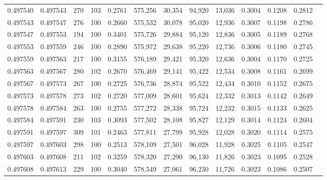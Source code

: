 \begin{tabular}{rrrrrrrrrrrrr}
0.497540 & 0.497543 &   270 & 103 &                                     0.2761 & 575,256 &  30,354 &  94,920 &  13,036 & 0.3004 & 0.1208 & 0.2812 \\
0.497543 & 0.497547 &   276 & 100 &                                     0.2660 & 575,532 &  30,078 &  95,020 &  12,936 & 0.3007 & 0.1198 & 0.2786 \\
0.497547 & 0.497553 &   194 & 100 &                                     0.3401 & 575,726 &  29,884 &  95,120 &  12,836 & 0.3005 & 0.1189 & 0.2768 \\
0.497553 & 0.497559 &   246 & 100 &                                     0.2890 & 575,972 &  29,638 &  95,220 &  12,736 & 0.3006 & 0.1180 & 0.2745 \\
0.497559 & 0.497563 &   217 & 100 &                                     0.3155 & 576,189 &  29,421 &  95,320 &  12,636 & 0.3004 & 0.1170 & 0.2725 \\
0.497563 & 0.497567 &   280 & 102 &                                     0.2670 & 576,469 &  29,141 &  95,422 &  12,534 & 0.3008 & 0.1161 & 0.2699 \\
0.497567 & 0.497573 &   267 & 100 &                                     0.2725 & 576,736 &  28,874 &  95,522 &  12,434 & 0.3010 & 0.1152 & 0.2675 \\
0.497573 & 0.497578 &   273 & 102 &                                     0.2720 & 577,009 &  28,601 &  95,624 &  12,332 & 0.3013 & 0.1142 & 0.2649 \\
0.497578 & 0.497584 &   263 & 100 &                                     0.2755 & 577,272 &  28,338 &  95,724 &  12,232 & 0.3015 & 0.1133 & 0.2625 \\
0.497584 & 0.497591 &   230 & 103 &                                     0.3093 & 577,502 &  28,108 &  95,827 &  12,129 & 0.3014 & 0.1124 & 0.2604 \\
0.497591 & 0.497597 &   309 & 101 &                                     0.2463 & 577,811 &  27,799 &  95,928 &  12,028 & 0.3020 & 0.1114 & 0.2575 \\
0.497597 & 0.497603 &   298 & 100 &                                     0.2513 & 578,109 &  27,501 &  96,028 &  11,928 & 0.3025 & 0.1105 & 0.2547 \\
0.497603 & 0.497608 &   211 & 102 &                                     0.3259 & 578,320 &  27,290 &  96,130 &  11,826 & 0.3023 & 0.1095 & 0.2528 \\
0.497608 & 0.497613 &   229 & 100 &                                     0.3040 & 578,549 &  27,061 &  96,230 &  11,726 & 0.3023 & 0.1086 & 0.2507 \\

\end{tabular}
